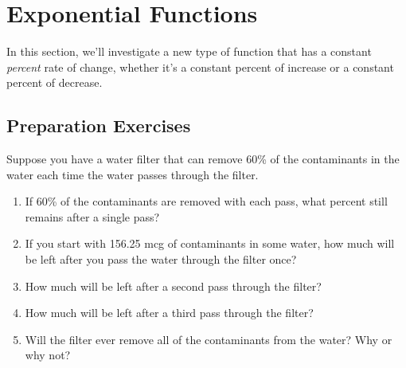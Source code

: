 
\section{Exponential Functions} \label{exponential-intro}

In this section, we'll investigate a new type of function that has a constant {\it percent} rate of change, whether it's a constant percent of increase or a constant percent of decrease.  \\[0.5em]



\subsection*{Preparation Exercises} \label{prep-exponential-intro}

\begin{myPrep}
Suppose you have a water filter that can remove 60\% of the contaminants in the water each time the water passes through the filter.
	\begin{enumerate}
		\item If 60\% of the contaminants are removed with each pass, what percent still remains after a single pass?
		\vfill
		\item If you start with 156.25 mcg of contaminants in some water, how much will be left after you pass the water through the filter once?
		\vfill
		\item How much will be left after a second pass through the filter?
		\vfill
		\item How much will be left after a third pass through the filter?
		\vfill
		\item Will the filter ever remove all of the contaminants from the water?  Why or why not?
		\vfill
	\end{enumerate}
\end{myPrep}



\newpage


